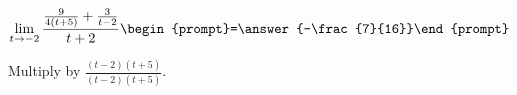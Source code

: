 \documentclass{ximera}
\author{Bart Snapp}
\begin{document}
\begin{exercise}

\[
\lim_{t\to -2 } \frac{\frac{9}{4 (t+5)}+\frac{3}{t-2}}{t+2}  \begin{prompt}=\answer{-\frac{7}{16}}\end{prompt}
\]
\begin{hint}
Multiply by $\frac{(t-2) (t+5)}{(t-2) (t+5)}$.
\end{hint}
\end{exercise}
\end{document}
